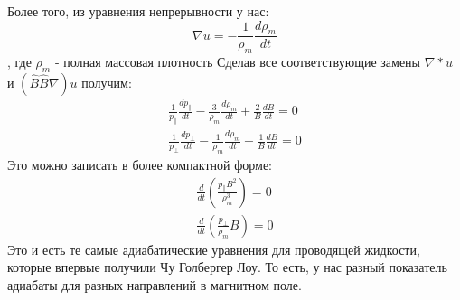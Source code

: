 \documentclass[10pt, a4paper]{article}
\begin{document}
Более того, из уравнения непрерывности у нас:
\begin{equation}
	\nabla u=-\frac{1}{\rho_m} \frac{d \rho_m}{dt}
\end{equation}
, где $\rho_m$ - полная массовая плотность
Сделав все соответствующие замены  $\nabla*u$ и $(\hat B \hat B \nabla)u$ получим:
\begin{align*}
	\frac{1}{p_{\parallel}} \frac{d p_{\parallel}}{dt} - \frac{3}{\rho_m} \frac{d \rho_m}{dt} + \frac{2}{B} \frac{dB}{dt}=0 \\
	\frac{1}{p_{\perp}} \frac{d p_{\perp}}{dt} - \frac{1}{\rho_m} \frac{d \rho_m}{dt} - \frac{1}{B} \frac{dB}{dt}=0
\end{align*}
Это можно записать в более компактной форме:
\begin{align*}
	\frac{d}{dt} (\frac{p_{\parallel}B^2}{\rho^3_m})=0 \\
	\frac{d}{dt} (\frac{p_{\perp}}{\rho_m}B)=0
\end{align*}
Это и есть те самые адиабатические уравнения для проводящей жидкости, которые впервые получили Чу Голбергер Лоу.
То есть, у нас разный показатель адиабаты для разных направлений в магнитном поле.


\newpage
{}


\end{document}
